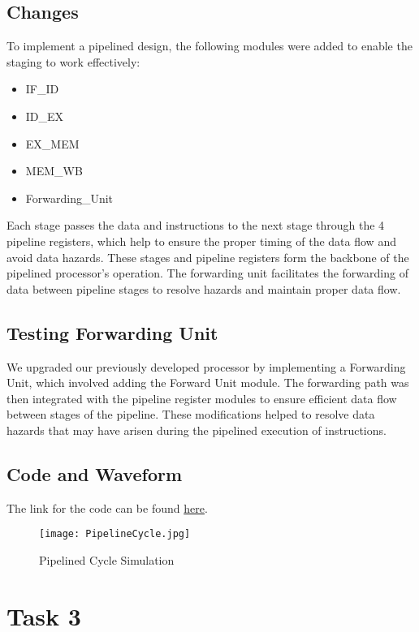 \documentclass{report}
\begin{document}
\subsection{Changes}

To implement a pipelined design, the following modules were added to enable the staging to work effectively:
\begin{itemize}
\item IF\_ID
\item ID\_EX
\item EX\_MEM
\item MEM\_WB
\item Forwarding\_Unit
\end{itemize}

Each stage passes the data and instructions to the next stage through the 4 pipeline registers, which help to ensure the proper timing of the data flow and avoid data hazards. These stages and pipeline registers form the backbone of the pipelined processor's operation. The forwarding unit facilitates the forwarding of data between pipeline stages to resolve hazards and maintain proper data flow.

\subsection{Testing Forwarding Unit}

We upgraded our previously developed processor by implementing a Forwarding Unit, which involved adding the Forward Unit module. The forwarding path was then integrated with the pipeline register modules to ensure efficient data flow between stages of the pipeline. These modifications helped to resolve data hazards that may have arisen during the pipelined execution of instructions.
\pagebreak
\subsection{Code and Waveform}
The link for the code can be found \href{https://github.com/NehalNN10/CA-final-project/blob/5b606f284db6f33765f0c830730e5cee43c01f18/final_project/final_project.srcs/sources_1/new/pipelinedProcessor.v}{here}.

\begin{figure}[h]
    \centerline{\texttt{[image: PipelineCycle.jpg]}}
    \caption{Pipelined Cycle Simulation}
\end{figure}

\section{Task 3}
\end{document}
